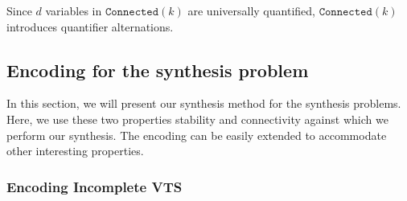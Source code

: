 Since $d$ variables in $\texttt{Connected}(k)$ are universally
quantified, $\texttt{Connected}(k)$ introduces quantifier alternations.
%
%


\subsection{Encoding for the synthesis problem}
In this section, we will present our synthesis method for
the synthesis problems.
%
%
%
Here, we use these two properties stability and connectivity against which we perform our synthesis. 
%
The encoding can be easily extended to accommodate other interesting properties. 

\subsubsection{Encoding Incomplete VTS}

